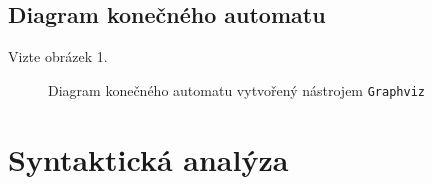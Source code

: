 \documentclass[11pt,a4paper]{article}
\begin{document}
\subsection{Diagram konečného automatu}
Vizte obrázek 1.

\begin{figure}[H]
	\caption{Diagram konečného automatu vytvořený nástrojem \texttt{Graphviz}}
\end{figure}

\pagebreak{}
    
\section{Syntaktická analýza}
    
\end{document}
